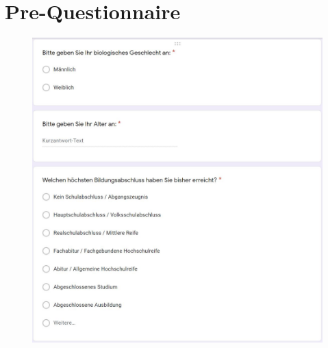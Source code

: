 \documentclass[a4paper,11pt]{article}%
\renewcommand{\\}{\vspace*{0.5\baselineskip} \newline}
\begin{document}
	
	\section{Pre-Questionnaire}
	\label{Pre-Questionnaire}
	
	\begin{figure}[H]
	\centering
		\begin{footnotesize}
			\includegraphics[scale=0.6]{Abbildungen/Fragebogen/Pre-Questionnaire/PQ1}\\
		\end{footnotesize}
	\end{figure}	
	
\end{document}
